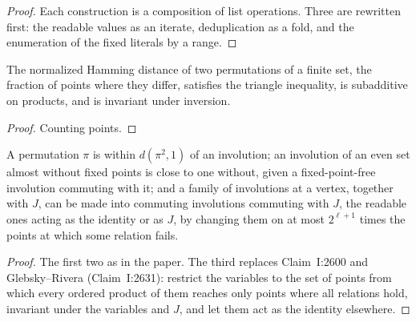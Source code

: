 \begin{proof}
\leanok
Each construction is a composition of list operations. Three are rewritten first: the readable
values as an iterate, deduplication as a fold, and the enumeration of the fixed literals by a
range.
\end{proof}

\begin{lemma}
\label{lem:perm-hamming}
\leanok
The normalized Hamming distance of two permutations of a finite set, the fraction of points
where they differ, satisfies the triangle inequality, is subadditive on products, and is
invariant under inversion.
\end{lemma}

\begin{proof}
\leanok
Counting points.
\end{proof}

\begin{lemma}
\label{lem:perm-stability}
\leanok
A permutation $\pi$ is within $d(\pi^2, 1)$ of an involution; an involution of an even set almost
without fixed points is close to one without, given a fixed-point-free involution commuting with
it; and a family of involutions at a vertex, together with $J$, can be made into commuting
involutions commuting with $J$, the readable ones acting as the identity or as $J$, by changing
them on at most $2^{\ell + 1}$ times the points at which some relation fails.
\end{lemma}

\begin{proof}
\leanok
The first two as in the paper. The third replaces Claim~I:2600 and Glebsky--Rivera
(Claim~I:2631): restrict the variables to the set of points from which every ordered product of
them reaches only points where all relations hold, invariant under the variables and $J$, and
let them act as the identity elsewhere.
\end{proof}


